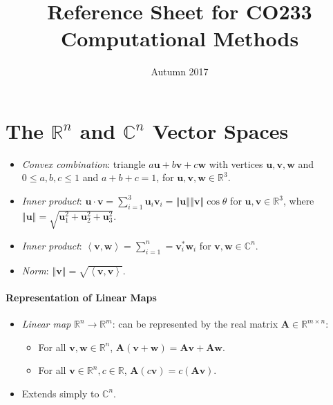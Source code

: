 \documentclass[twocolumn,english]{article}
\begin{document}
\title{Reference Sheet for CO233 Computational Methods}

\date{Autumn 2017}
\maketitle

\section{The $\mathbb{R}^{n}$ and $\mathbb{C}^{n}$ Vector Spaces}
\begin{itemize}
\item \emph{Convex combination}: triangle $a\boldsymbol{u}+b\boldsymbol{v}+c\boldsymbol{w}$
with vertices $\boldsymbol{u},\boldsymbol{v},\boldsymbol{w}$ and
$0\leq a,b,c\leq1$ and $a+b+c=1$, for $\boldsymbol{u},\boldsymbol{v},\boldsymbol{w}\in\mathbb{R}^{3}$.
\item \emph{Inner product}: $\boldsymbol{u}\cdot\boldsymbol{v}=\sum_{i=1}^{3}\boldsymbol{u}_{i}\boldsymbol{v}_{i}=\left\Vert \boldsymbol{u}\right\Vert \left\Vert \boldsymbol{v}\right\Vert \cos\theta$
for $\boldsymbol{u},\boldsymbol{v}\in\mathbb{R}^{3}$, where $\left\Vert \boldsymbol{u}\right\Vert =\sqrt{\boldsymbol{u}_{1}^{2}+\boldsymbol{u}_{2}^{2}+\boldsymbol{u}_{3}^{2}}$.
\item \emph{Inner product}: $\left\langle \boldsymbol{v},\boldsymbol{w}\right\rangle =\sum_{i=1}^{n}=\boldsymbol{v}_{i}^{*}\boldsymbol{w}_{i}$
for $\boldsymbol{v},\boldsymbol{w}\in\mathbb{\mathbb{C}}^{n}$.
\item \emph{Norm}: $\left\Vert \boldsymbol{v}\right\Vert =\sqrt{\left\langle \boldsymbol{v},\boldsymbol{v}\right\rangle }$.
\end{itemize}

\paragraph{Representation of Linear Maps}
\begin{itemize}
\item \emph{Linear map} $\mathbb{R}^{n}\rightarrow\mathbb{R}^{m}$: can
be represented by the real matrix $\boldsymbol{A}\in\mathbb{R}^{m\times n}$:
\begin{itemize}
\item For all $\boldsymbol{v},\boldsymbol{w}\in\mathbb{R}^{n}$, $\boldsymbol{A}(\boldsymbol{v}+\boldsymbol{w})=\boldsymbol{Av}+\boldsymbol{Aw}$.
\item For all $\boldsymbol{v}\in\mathbb{R}^{n},c\in\mathbb{R}$, $\boldsymbol{A}(c\boldsymbol{v})=c\left(\boldsymbol{Av}\right)$.
\end{itemize}
\item Extends simply to $\mathbb{C}^{n}$.
\end{itemize}
\end{document}
